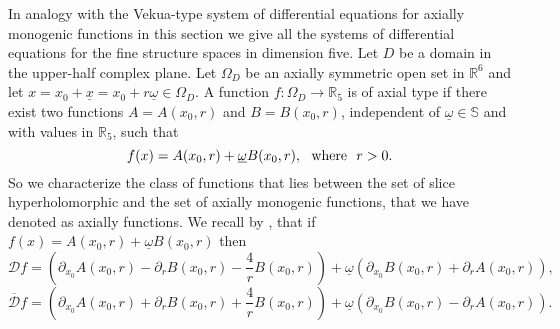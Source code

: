 \documentclass[reqno,11pt]{amsart}
\numberwithin{equation}{section}
\theoremstyle{definition}
\begin{document}
In  analogy with the Vekua-type system of differential equations for axially monogenic functions in this section we give all the systems of differential equations for the fine structure spaces in dimension five.
Let $D$ be a domain in the upper-half complex plane.
Let $\Omega_D$ be an axially symmetric open set in $ \mathbb{R}^{6}$ and let $x=x_0+ \underline{x}=x_0+r \underline{\omega} \in \Omega_D$. A function $ f: \Omega_D \to \mathbb{R}_5$ is of axial type if there exist two functions $A=A(x_0,r)$ and $B=B(x_0,r)$, independent of $ \underline{\omega} \in \mathbb{S}$ and with values in $ \mathbb{R}_5$, such that
	$$ f(x)= A(x_0,r)+ \underline{\omega}B(x_0,r), \ \ {\rm where}\ \ r>0. $$
So we characterize the class of functions that lies between the set of slice hyperholomorphic and the set of axially monogenic functions, that we have denoted as axially functions. We recall by \cite{Dixan}, that if $f(x)=A(x_0,r)+ \underline{\omega} B(x_0, r)$ then
\begin{equation}
\label{Dirac}
\mathcal{D}f= \left(\partial_{x_0} A(x_0,r)- \partial_r B(x_0,r)- \frac{4}{r}B(x_0,r)\right)+ \underline{\omega}\left(\partial_{x_0}B(x_0,r)+ \partial_r A(x_0,r)\right),
\end{equation}
\begin{equation}
\label{NDirac}
\mathcal{\overline{D}}f= \left(\partial_{x_0} A(x_0,r)+ \partial_r B(x_0,r)+ \frac{4}{r}B(x_0,r)\right)+ \underline{\omega}\left(\partial_{x_0}B(x_0,r)- \partial_r A(x_0,r)\right).
\end{equation}
\end{document}

